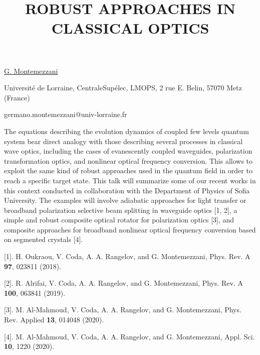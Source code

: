 \title{ROBUST APPROACHES IN CLASSICAL OPTICS}

\underline{G. Montemezzani} 

{\normalsize{\vspace{-4mm}
Universit\'e de Lorraine, CentraleSup\'elec, LMOPS, 2 rue E. Belin, 57070 Metz (France)



\email germano.montemezzani@univ-lorraine.fr}}

The equations describing the evolution dynamics of coupled few levels quantum system bear direct analogy with those describing several processes in classical wave optics, including the cases of evanescently coupled waveguides, polarization transformation optics, and nonlinear optical frequency conversion. This allows to exploit the same kind of robust approaches used in the quantum field in order to reach a specific target state. This talk will summarize some of our recent works in this context conducted in collaboration with the Department of Physics of Sofia University. The examples will involve adiabatic approaches for light transfer or broadband polarization selective beam splitting in waveguide optics [1, 2], a simple and robust composite optical rotator for polarization optics [3], and composite approaches for broadband nonlinear optical frequency conversion based on segmented crystals [4].

{\normalsize
[1]. H. Oukraou, V. Coda, A. A. Rangelov, and G. Montemezzani, Phys. Rev. A \textbf{97}, 023811 (2018).
\vsp

[2]. R. Alrifai, V. Coda, A. A. Rangelov, and G. Montemezzani, Phys. Rev. A \textbf{100}, 063841 (2019).
\vsp

[3]. M. Al-Mahmoud, V. Coda, A. A. Rangelov, and G. Montemezzani, Phys. Rev. Applied \textbf{13}, 014048 (2020).
\vsp

[4]. M. Al-Mahmoud, V. Coda, A. A. Rangelov, and G. Montemezzani, Appl. Sci. \textbf{10}, 1220 (2020).
}

\vspace{\baselineskip}

